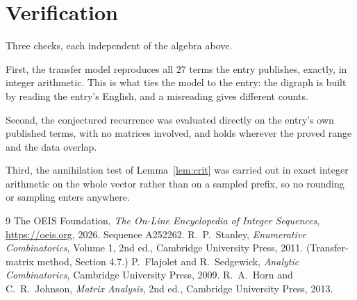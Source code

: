 \documentclass[11pt,a4paper]{article}
\theoremstyle{plain}
\theoremstyle{definition}
\begin{document}
\section{Verification}

Three checks, each independent of the algebra above.

First, the transfer model reproduces all $27$ terms the entry publishes, exactly, in
integer arithmetic. This is what ties the model to the entry: the digraph is built by reading
the entry's English, and a misreading gives different counts.

Second, the conjectured recurrence was evaluated directly on the entry's own published terms,
with no matrices involved, and holds wherever the proved range and the data overlap.

Third, the annihilation test of Lemma~\ref{lem:crit} was carried out in exact integer
arithmetic on the whole vector rather than on a sampled prefix, so no rounding or sampling
enters anywhere.

\begin{thebibliography}{9}
 The OEIS Foundation, \emph{The On-Line Encyclopedia of Integer
Sequences}, \url{https://oeis.org}, 2026. Sequence A252262.
 R.~P.~Stanley, \emph{Enumerative Combinatorics}, Volume 1, 2nd ed.,
Cambridge University Press, 2011. (Transfer-matrix method, Section 4.7.)
 P.~Flajolet and R.~Sedgewick, \emph{Analytic Combinatorics}, Cambridge
University Press, 2009.
 R.~A.~Horn and C.~R.~Johnson, \emph{Matrix Analysis}, 2nd ed., Cambridge
University Press, 2013.
\end{thebibliography}
\end{document}
